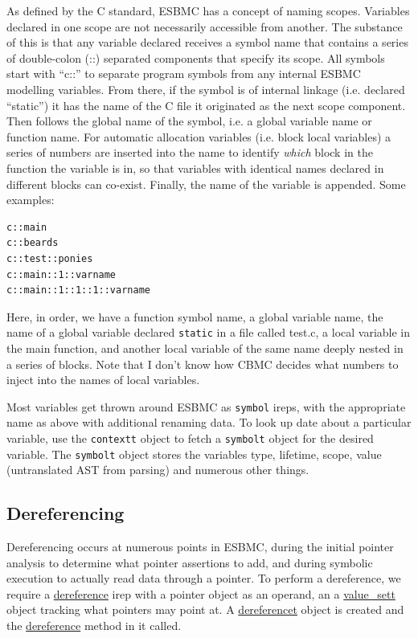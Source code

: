 \documentclass{article}
\begin{document}
As defined by the C standard, ESBMC has a concept of naming scopes. Variables
declared in one scope are not necessarily accessible from another. The substance
of this is that any variable declared receives a symbol name that contains
a series of double-colon (::) separated components that specify its scope. All
symbols start with ``c::'' to separate program symbols from any internal
ESBMC modelling variables. From there, if the symbol is of internal linkage
(i.e. declared ``static'') it has the name of the C file it originated as
the next scope component. Then follows the global name of the symbol, i.e.
a global variable name or function name. For automatic allocation variables
(i.e. block local variables) a series of numbers are inserted into the
name to identify \textit{which} block in the function the variable is in, so
that variables with identical names declared in different blocks can co-exist.
Finally, the name of the variable is appended. Some examples:

\begin{lstlisting}
c::main
c::beards
c::test::ponies
c::main::1::varname
c::main::1::1::1::varname
\end{lstlisting}

Here, in order, we have a function symbol name, a global variable name,
the name of a global variable declared \texttt{static} in a file called test.c,
a local variable in the main function, and another local variable of the same
name deeply nested in a series of blocks. Note that I don't know how CBMC
decides what numbers to inject into the names of local variables.

Most variables get thrown around ESBMC as \texttt{symbol} ireps, with the
appropriate name as above with additional renaming data. To look up date about
a particular variable, use the \texttt{contextt} object to fetch a
\texttt{symbolt} object for the desired variable. The \texttt{symbolt} object
stores the variables type, lifetime, scope, value (untranslated AST from
parsing) and numerous other things.

\subsection{Dereferencing}

Dereferencing occurs at numerous points in ESBMC, during the initial pointer
analysis to determine what pointer assertions to add, and during symbolic
execution to actually read data through a pointer. To perform a dereference,
we require a \url{dereference} irep with a pointer object as an operand,
an a \url{value_sett} object tracking what pointers may point at. A
\url{dereferencet} object is created and the \url{dereference} method in it
called.
\end{document}
